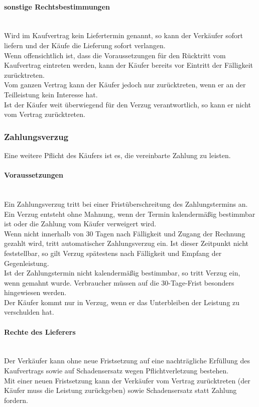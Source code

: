 	\paragraph{sonstige Rechtsbestimmungen}~\\ Wird im Kaufvertrag kein Liefertermin genannt, so kann der Verkäufer sofort liefern und der Käufe die Lieferung sofort verlangen. \\
	Wenn offensichtlich ist, dass die Voraussetzungen für den Rücktritt vom Kaufvertrag eintreten werden, kann der Käufer bereits vor Eintritt der Fälligkeit zurücktreten.\\
	Vom ganzen Vertrag kann der Käufer jedoch nur zurücktreten, wenn er an der Teilleistung kein Interesse hat.\\
	Ist der Käufer weit überwiegend für den Verzug verantwortlich, so kann er nicht vom Vertrag zurücktreten.
	
\subsubsection{Zahlungsverzug}
Eine weitere Pflicht des Käufers ist es, die vereinbarte Zahlung zu leisten.
	\paragraph{Voraussetzungen}~\\ Ein Zahlungsverzug tritt bei einer Fristüberschreitung des Zahlungstermins an. Ein Verzug entsteht ohne Mahnung, wenn der Termin kalendermäßig bestimmbar ist oder die Zahlung vom Käufer verweigert wird. \\
	Wenn nicht innerhalb von 30 Tagen nach Fälligkeit und Zugang der Rechnung gezahlt wird, tritt automatischer Zahlungsverzug ein. Ist dieser Zeitpunkt nicht feststellbar, so gilt Verzug spätestens nach Fälligkeit und Empfang der Gegenleistung.\\
	Ist der Zahlungstermin nicht kalendermäßig bestimmbar, so tritt Verzug ein, wenn gemahnt wurde. Verbraucher müssen auf die 30-Tage-Frist besonders hingewiesen werden.\\
	Der Käufer kommt nur in Verzug, wenn er das Unterbleiben der Leistung zu verschulden hat.
	\paragraph{Rechte des Lieferers}~\\ Der Verkäufer kann ohne neue Fristsetzung auf eine nachträgliche Erfüllung des Kaufvertrags sowie auf Schadensersatz wegen Pflichtverletzung bestehen.\\
	Mit einer neuen Fristsetzung kann der Verkäufer vom Vertrag zurücktreten (der Käufer muss die Leistung zurückgeben) sowie Schadensersatz statt Zahlung fordern.
